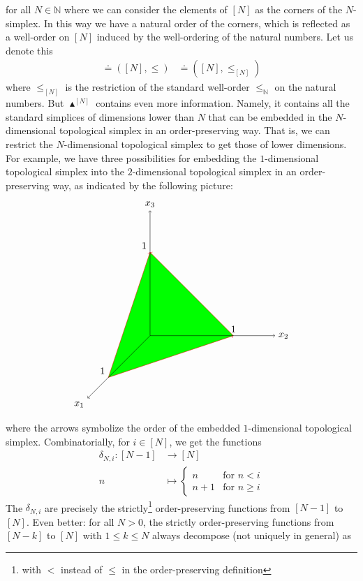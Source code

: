 for all $N \in \mathbb{N}$ where we can consider the elements of $[N]$ as the corners of the $N$-simplex.
In this way we have a natural order of the corners, which is reflected as a well-order on $[N]$ induced by the well-ordering of the natural numbers.
Let us denote this
\begin{align*}
  [N]
  \doteq
  ([N],\leq)
  &\doteq
  ([N],\leq_{[N]})
\end{align*}
where $\leq_{[N]}$ is the restriction of the standard well-order $\leq_{\mathbb{N}}$ on the natural numbers.
But $\blacktriangle^{[N]}$ contains even more information.
Namely, it contains all the standard simplices of dimensions lower than $N$ that can be embedded in the $N$-dimensional topological simplex in an order-preserving way.
That is, we can restrict the $N$-dimensional topological simplex to get those of lower dimensions.
For example, we have three possibilities for embedding the $1$-dimensional topological simplex into the $2$-dimensional topological simplex in an order-preserving way, as indicated by the following picture:
\[
\begin{tikzpicture}[scale=0.75]
  \fill[fill=green]
    (-2,-2) node[above left] {$1$}
    --
    (4,0) node[above] {$1$}
    --
    (0,4) node[above left] {$1$}
    --
    cycle;
  \draw[->,red]
    (-2,-2)
    --
    (4,0);
  \draw[->,red]
    (-2,-2)
    --
    (0,4);
  \draw[->,red]
    (4,0)
    --
    (0,4);
  \draw[->]
    (0,0)
    --
    (-3,-3) node[below left] {$x_{1}$};
  \draw[->]
    (0,0)
    --
    (6,0) node[right] {$x_{2}$};
  \draw[->]
    (0,0)
    --
    (0,6) node[above] {$x_{3}$};
\end{tikzpicture}
\]
where the arrows symbolize the order of the embedded $1$-dimensional topological simplex.
Combinatorially, for $i \in [N]$, we get the functions
\begin{align*}
  \delta_{N,i}
  \colon
  [N-1]
  &\rightarrow
  [N]
  \\
  n
  &\mapsto
  \begin{cases}
    n
    &
    \text{for }
    n
    <
    i
    \\
    n
    +
    1
    &
    \text{for }
    n
    \geq
    i
  \end{cases}
\end{align*}
The $\delta_{N,i}$ are precisely the strictly\footnote{with $<$ instead of $\leq$ in the order-preserving definition} order-preserving functions from $[N-1]$ to $[N]$.
Even better: for all $N > 0$, the strictly order-preserving functions from $[N-k]$ to $[N]$ with $1 \leq k \leq N$ always decompose (not uniquely in general) as
